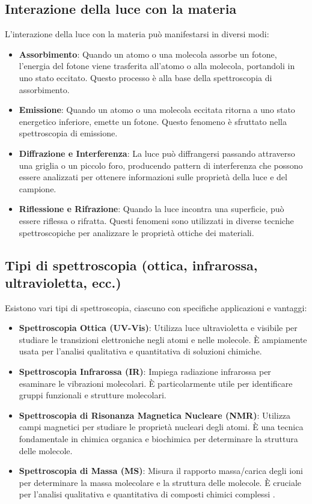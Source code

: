 \documentclass[12pt,a4paper]{report}
\begin{document}
\subsection{Interazione della luce con la materia}

L'interazione della luce con la materia può manifestarsi in diversi modi:

\begin{itemize}
\item \textbf{Assorbimento}: Quando un atomo o una molecola assorbe un fotone, l'energia del fotone viene trasferita all'atomo o alla molecola, portandoli in uno stato eccitato. Questo processo è alla base della spettroscopia di assorbimento.
\item \textbf{Emissione}: Quando un atomo o una molecola eccitata ritorna a uno stato energetico inferiore, emette un fotone. Questo fenomeno è sfruttato nella spettroscopia di emissione.
\item \textbf{Diffrazione e Interferenza}: La luce può diffrangersi passando attraverso una griglia o un piccolo foro, producendo pattern di interferenza che possono essere analizzati per ottenere informazioni sulle proprietà della luce e del campione.
\item \textbf{Riflessione e Rifrazione}: Quando la luce incontra una superficie, può essere riflessa o rifratta. Questi fenomeni sono utilizzati in diverse tecniche spettroscopiche per analizzare le proprietà ottiche dei materiali.
\end{itemize}

\subsection{Tipi di spettroscopia (ottica, infrarossa, ultravioletta, ecc.)}

Esistono vari tipi di spettroscopia, ciascuno con specifiche applicazioni e vantaggi:

\begin{itemize}
\item \textbf{Spettroscopia Ottica (UV-Vis)}: Utilizza luce ultravioletta e visibile per studiare le transizioni elettroniche negli atomi e nelle molecole. È ampiamente usata per l'analisi qualitativa e quantitativa di soluzioni chimiche.
\item \textbf{Spettroscopia Infrarossa (IR)}: Impiega radiazione infrarossa per esaminare le vibrazioni molecolari. È particolarmente utile per identificare gruppi funzionali e strutture molecolari.
\item \textbf{Spettroscopia di Risonanza Magnetica Nucleare (NMR)}: Utilizza campi magnetici per studiare le proprietà nucleari degli atomi. È una tecnica fondamentale in chimica organica e biochimica per determinare la struttura delle molecole.
\item \textbf{Spettroscopia di Massa (MS)}: Misura il rapporto massa/carica degli ioni per determinare la massa molecolare e la struttura delle molecole. È cruciale per l'analisi qualitativa e quantitativa di composti chimici complessi \cite{banwell2013fundamentals}.
\end{itemize}
\end{document}
